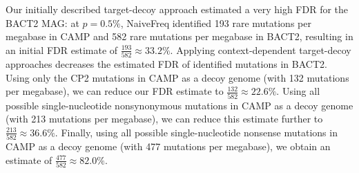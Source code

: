 Our initially described target-decoy approach estimated a very high FDR for the BACT2 MAG:
at $p = 0.5\%$, NaiveFreq identified 193 rare mutations per megabase in CAMP and 582 rare mutations per megabase in BACT2, resulting in an initial FDR estimate of $\frac{193}{582} \approx 33.2\%$.
%
Applying context-dependent target-decoy approaches decreases the estimated FDR of identified mutations in BACT2.
%
Using only the CP2 mutations in CAMP as a decoy genome (with 132 mutations per megabase), we can reduce our FDR estimate to $\frac{132}{582} \approx 22.6\%$.
%
Using all possible single-nucleotide nonsynonymous mutations in CAMP as a decoy genome (with 213 mutations per megabase), we can reduce this estimate further to $\frac{213}{582} \approx 36.6\%$.
%
Finally, using all possible single-nucleotide nonsense mutations in CAMP as a decoy genome (with 477 mutations per megabase), we obtain an estimate of $\frac{477}{582} \approx 82.0\%$.
\endinput